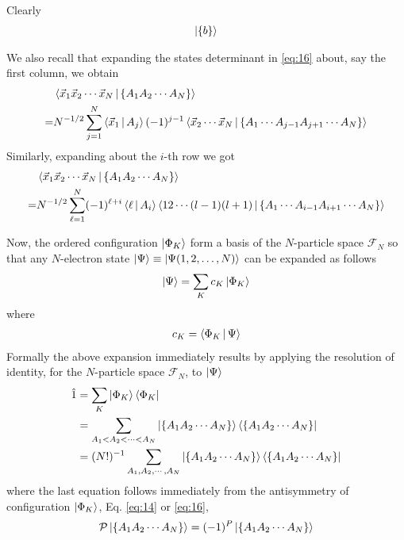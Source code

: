 \documentclass{book}
\renewcommand{\braket}[1]{\Braket{#1}}
\renewcommand{\ket}[1]{\Ket{#1}}
\renewcommand{\bra}[1]{\Bra{#1}}
\begin{document}
Clearly
\begin{align}
    \ket{\{b\}}
\end{align}

We also recall that expanding the states determinant in \eqref{eq:16} about, say the first column, we obtain 
\begin{align}
    &\braket{\vec{x}_1\vec{x}_2\cdots\vec{x}_N|\{A_1A_2\cdots A_N\}}\notag\\
    =&N^{-1/2}\sum_{j=1}^N\braket{\vec{x}_1|A_j}(-1)^{j-1}\braket{\vec{x}_2\cdots\vec{x}_N|\{A_1\cdots A_{j-1}A_{j+1}\cdots A_N\}}
    \label{eq:19}
\end{align} 
Similarly, expanding about the $i$-th row we got
\begin{align}
    &\braket{\vec{x}_1\vec{x}_2\cdots\vec{x}_N|\{A_1A_2\cdots A_N\}}\notag\\
    =&N^{-1/2}\sum_{\ell=1}^N (-1)^{\ell+i}\braket{\ell|A_i} \braket{12\cdots(l-1)(l+1)|\{A_1\cdots A_{i-1}A_{i+1}\cdots A_N\}}
    \label{eq:20}
\end{align}

Now, the ordered configuration $\ket{\Phi_K}$ form a basis of the $N$-particle space $\mathcal{F}_N$ so that any $N$-electron state $\ket{\Psi}\equiv \ket{\Psi(1,2,\ldots,N)}$ can be expanded as follows 
\begin{align}
    \ket{\Psi} = \sum_K c_K\ket{\Phi_K}
\end{align}
where 
\begin{align}
    c_K = \braket{\Phi_K|\Psi}
\end{align}
Formally the above expansion immediately results by applying the resolution of identity, for the $N$-particle space $\mathcal{F}_N$, to $\ket{\Psi}$ 
\begin{align}
    \hat{1} & = \sum_K \ket{\Phi_K}\bra{\Phi_K} \notag\\
            & = \sum_{A_1<A_2<\cdots<A_N}\ket{\{A_1A_2\cdots A_N\}}\bra{\{A_1A_2\cdots A_N\}} \notag\\
            & = (N!)^{-1} \sum_{A_1,A_2,\cdots,A_N}\ket{\{A_1A_2\cdots A_N\}}\bra{\{A_1A_2\cdots A_N\}}
\end{align}
where the last equation follows immediately from the antisymmetry of configuration $\ket{\Phi_K}$, Eq. \eqref{eq:14} or \eqref{eq:16},
\begin{align}
    \mathcal{P}\ket{\{A_1A_2\cdots A_N\}} = (-1)^P\ket{\{A_1A_2\cdots A_N\}}
\end{align}
\end{document}
